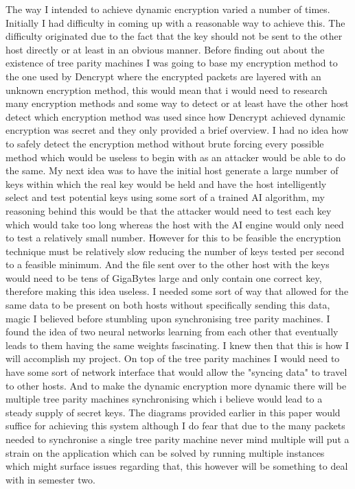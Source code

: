 The way I intended to achieve dynamic encryption varied a number of times. Initially I had difficulty in coming up with a reasonable way to achieve this. The difficulty originated due to the fact that the key should not be sent to the other host directly or at least in an obvious manner. Before finding out about the existence of tree parity machines I was going to base my encryption method to the one used by Dencrypt where the encrypted packets are layered with an unknown encryption method, this would mean that i would need to research many encryption methods and some way to detect or at least have the other host detect which encryption method was used since how Dencrypt achieved dynamic encryption was secret and they only provided a brief overview. I had no idea how to safely detect the encryption method without brute forcing every possible method which would be useless to begin with as an attacker would be able to do the same. My next idea was to have the initial host generate a large number of keys within which the real key would be held and have the host intelligently select and test potential keys using some sort of a trained AI algorithm, my reasoning behind this would be that the attacker would need to test each key which would take too long whereas the host with the AI engine would only need to test a relatively small number. However for this to be feasible the encryption technique must be relatively slow reducing the number of keys tested per second to a feasible minimum. And the file sent over to the other host with the keys would need to be tens of GigaBytes large and only contain one correct key, therefore making this idea useless. I needed some sort of way that allowed for the same data to be present on both hosts without specifically sending this data, magic I believed before stumbling upon synchronising tree parity machines. I found the idea of two neural networks learning from each other that eventually leads to them having the same weights fascinating. I knew then that this is how I will accomplish my project. On top of the tree parity machines I would need to have some sort of network interface that would allow the "syncing data" to travel to other hosts. And to make the dynamic encryption more dynamic there will be multiple tree parity machines synchronising which i believe would lead to a steady supply of secret keys. The diagrams provided earlier in this paper would suffice for achieving this system although I do fear that due to the many packets needed to synchronise a single tree parity machine never mind multiple will put a strain on the application which can be solved by running multiple instances which might surface issues regarding that, this however will be something to deal with in semester two.


